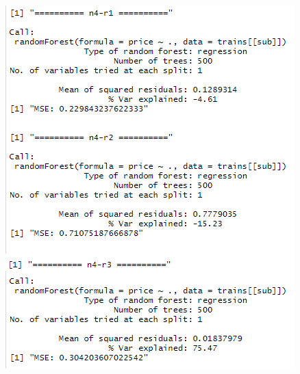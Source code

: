 \documentclass{FR16}
\begin{document}
\begin{figure}[!htb]
\begin{minipage}{0.33\textwidth}
   \end{minipage}\hfill
   \begin{minipage}{0.33\textwidth}
     \centering
     \includegraphics[width=1\linewidth]{figures/rf5.png}
   \end{minipage}
   \begin{minipage}{0.33\textwidth}
     \centering

\end{minipage}
\end{figure}
\end{document}
